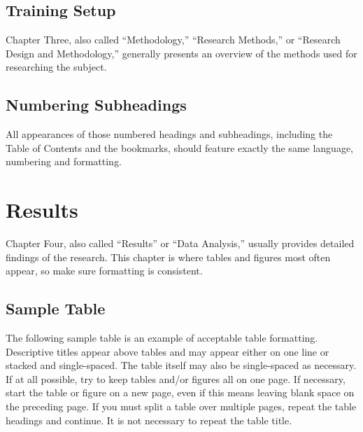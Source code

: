 \documentclass{UCF_ETD}
\begin{document}
\section{Training Setup}

Chapter Three, also called “Methodology,” “Research Methods,” or “Research Design and Methodology,” generally presents an overview of the methods used for researching the subject.

\section{Numbering Subheadings}
All appearances of those numbered headings and subheadings, including the Table of Contents and the bookmarks, should feature exactly the same language, numbering and formatting.






\chapter{Results}
Chapter Four, also called ``Results'' or ``Data Analysis,'' usually provides detailed findings of the research.  This chapter is where tables and figures most often appear, so make sure formatting is consistent.

\section{Sample Table}
The following sample table is an example of acceptable table formatting. Descriptive titles appear above tables and may appear either on one line or stacked and single-spaced. The table itself may also be single-spaced as necessary. If at all possible, try to keep tables and/or figures all on one page. If necessary, start the table or figure on a new page, even if this means leaving blank space on the preceding page. If you must split a table over multiple pages, repeat the table headings and continue. It is not necessary to repeat the table title.
\end{document}
